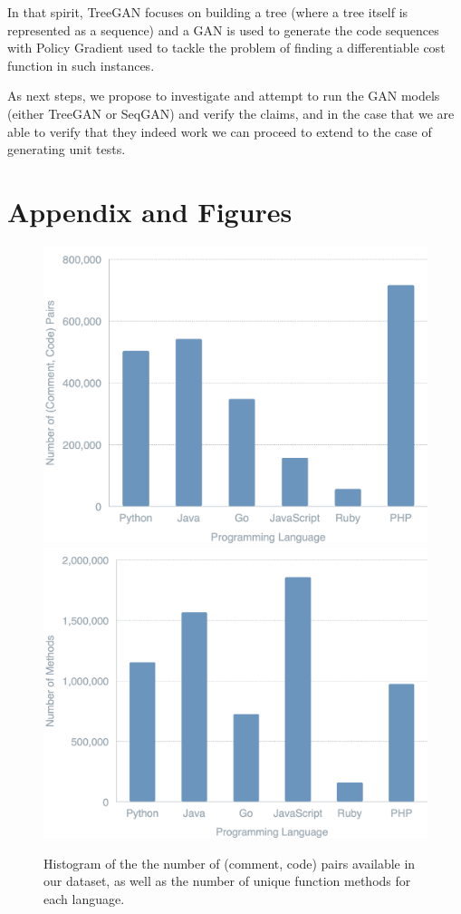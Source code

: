 \documentclass{article}
\begin{document}
In that spirit, TreeGAN \cite{treegan} focuses on building a tree (where a tree itself is represented as a sequence) and a GAN is used to generate the code sequences with Policy Gradient used to tackle the problem of finding a differentiable cost function in such instances. 

As next steps, we propose to investigate and attempt to run the GAN models (either TreeGAN or SeqGAN) and verify the claims, and in the case that we are able to verify that they indeed work we can proceed to extend to the case of generating unit tests.






\newpage
\section*{Appendix and Figures}

\begin{figure}[!ht]
    \centering
    \includegraphics[scale=0.12]{figures/data_analysis/dist2.png}
    \includegraphics[scale=0.12]{figures/data_analysis/dists3.png}
    \caption{Histogram of the the number of (comment, code) pairs available in our dataset, as well as the number of unique function methods for each language.}
    \label{fig:dist_methods}
\end{figure}
\end{document}
